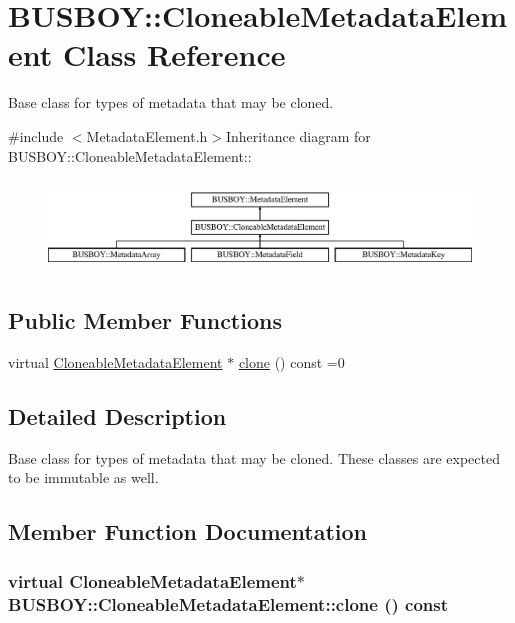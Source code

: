 \hypertarget{classBUSBOY_1_1CloneableMetadataElement}{
\section{BUSBOY::CloneableMetadataElement Class Reference}
\label{classBUSBOY_1_1CloneableMetadataElement}
}


Base class for types of metadata that may be cloned.  


{\ttfamily \#include $<$MetadataElement.h$>$}Inheritance diagram for BUSBOY::CloneableMetadataElement::\begin{figure}[H]
\begin{center}
\leavevmode
\includegraphics[height=2.43478cm]{classBUSBOY_1_1CloneableMetadataElement}
\end{center}
\end{figure}
\subsection*{Public Member Functions}
\begin{DoxyCompactItemize}
\item 
virtual \hyperlink{classBUSBOY_1_1CloneableMetadataElement}{CloneableMetadataElement} $\ast$ \hyperlink{classBUSBOY_1_1CloneableMetadataElement_af09790fd6aa07e67fc8c2a0a8cb09291}{clone} () const =0
\end{DoxyCompactItemize}


\subsection{Detailed Description}
Base class for types of metadata that may be cloned. These classes are expected to be immutable as well. 

\subsection{Member Function Documentation}
\hypertarget{classBUSBOY_1_1CloneableMetadataElement_af09790fd6aa07e67fc8c2a0a8cb09291}{
\subsubsection[{clone}]{\setlength{\rightskip}{0pt plus 5cm}virtual {\bf CloneableMetadataElement}$\ast$ BUSBOY::CloneableMetadataElement::clone () const}}
\label{classBUSBOY_1_1CloneableMetadataElement_af09790fd6aa07e67fc8c2a0a8cb09291}


